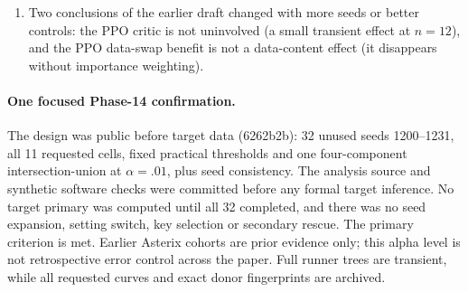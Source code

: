\documentclass[10pt]{article} %
\begin{document}
\begin{enumerate}[label=(\arabic*)]
No formal primary analysis was run before the full planned cohort. A/B/C/E progress streams withheld scores. D's existing detailed training log was redirected and not examined to select a model or sample; fixed feature rows were archived for preservation, not fitted. The frozen coefficient hash was unchanged at evaluation. A's stronger compound, E's substantial-delayed-harm rule and D's practical-utility rule do not pass the final correction; none is rescued by a secondary comparison, selected context or pooled cohort. All execution logs and null/inconclusive results are archived.
\item Two conclusions of the earlier draft changed with more seeds or better controls: the PPO critic is not uninvolved (a small transient effect at $n=12$), and the PPO data-swap benefit is not a data-content effect (it disappears without importance weighting).
\end{enumerate}

\paragraph{One focused Phase-14 confirmation.}
The design was public before target data (6262b2b): 32 unused seeds 1200--1231, all 11 requested cells, fixed practical thresholds and one four-component intersection-union at $\alpha=.01$, plus seed consistency. The analysis source and synthetic software checks were committed before any formal target inference. No target primary was computed until all 32 completed, and there was no seed expansion, setting switch, key selection or secondary rescue. The primary criterion is met. Earlier Asterix cohorts are prior evidence only; this alpha level is not retrospective error control across the paper. Full runner trees are transient, while all requested curves and exact donor fingerprints are archived.
\end{document}
